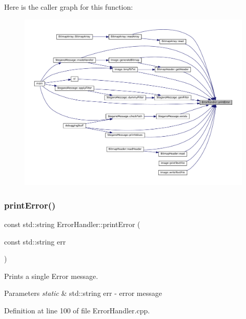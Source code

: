 Here is the caller graph for this function\+:\nopagebreak
\begin{figure}[H]
\begin{center}
\leavevmode
\includegraphics[width=350pt]{classErrorHandler_ab90b8248f24e3129df69d224585956dd_icgraph}
\end{center}
\end{figure}
\mbox{\label{classErrorHandler_ad1e6aa8018e2a22460a1431e6e7d8804}} 
\subsubsection{\texorpdfstring{printError()}{printError()}\hspace{0.1cm}{\footnotesize\ttfamily [2/2]}}
{\footnotesize\ttfamily const std\+::string Error\+Handler\+::print\+Error (\begin{DoxyParamCaption}\item[{const std\+::string}]{err }\end{DoxyParamCaption})}



Prints a single Error message. 


\begin{DoxyParams}{Parameters}
{\em static} & std\+::string err -\/ error message \\
\hline
\end{DoxyParams}


Definition at line 100 of file Error\+Handler.\+cpp.

